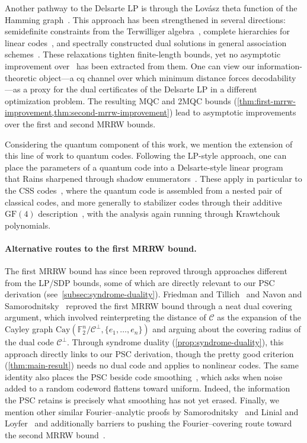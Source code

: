 \documentclass[11pt]{article}
\theoremstyle{remark}
\newcommand{\cC}{\mathcal{C}}
\newcommand{\F}{\mathbb{F}}
\begin{document}
Another pathway to the Delsarte LP is through the Lov\'asz theta function of the Hamming graph~\cite{Lov79,MRR78,Sch79}. This approach has been strengthened in several directions: semidefinite constraints from the Terwilliger algebra~\cite{Sch05}, complete hierarchies for linear codes~\cite{CJJ22,LL23b,CJJLL26}, and spectrally constructed dual solutions in general association schemes~\cite{CDA25}. These relaxations tighten finite-length bounds, yet no asymptotic improvement over~\cite{MRRW77} has been extracted from them. One can view our information-theoretic object---a cq channel over which minimum distance forces decodability---as a proxy for the dual certificates of the Delsarte LP in a different optimization problem. The resulting MQC and 2MQC bounds (\cref{thm:first-mrrw-improvement,thm:second-mrrw-improvement}) lead to asymptotic improvements over the first and second MRRW bounds.

Considering the quantum component of this work, we mention the extension of this line of work to quantum codes. Following the LP-style approach, one can place the parameters of a quantum code into a Delsarte-style linear program~\cite{AL99} that Rains sharpened through shadow enumerators~\cite{Rai99}. These apply in particular to the CSS codes~\cite{CS96,Ste96}, where the quantum code is assembled from a nested pair of classical codes, and more generally to stabilizer codes through their additive $\mathrm{GF}(4)$ description~\cite{CRSS98}, with the analysis again running through Krawtchouk polynomials.

\paragraph{Alternative routes to the first MRRW bound.} The first MRRW bound has since been reproved through approaches different from the LP/SDP bounds, some of which are directly relevant to our PSC derivation (see~\cref{subsec:syndrome-duality}). Friedman and Tillich~\cite{FT05} and Navon and Samorodnitsky~\cite{NS09} reproved the first MRRW bound through a neat dual covering argument, which involved reinterpreting the distance of $\cC$ as the expansion of the Cayley graph $\text{Cay}(\F_2^n/\cC^\perp,\{e_1, \ldots , e_n\})$ and arguing about the covering radius of the dual code $\cC^\perp$. Through syndrome duality (\cref{prop:syndrome-duality}), this approach directly links to our PSC derivation, though the pretty good criterion (\cref{thm:main-result}) needs no dual code and applies to nonlinear codes. The same identity also places the PSC beside code smoothing~\cite{BLVW19,YZ21,DADRT23,PB23,DAR25,PB25a,AGNTV26}, which asks when noise added to a random codeword flattens toward uniform. Indeed, the information the PSC retains is precisely what smoothing has not yet erased. Finally, we mention other similar Fourier--analytic proofs by Samorodnitsky~\cite{Sam23} and Linial and Loyfer~\cite{LL23a} and additionally barriers to pushing the Fourier--covering route toward the second MRRW bound~\cite{Sam25}.
\end{document}
